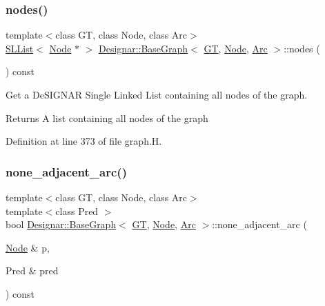 \subsubsection{\texorpdfstring{nodes()}{nodes()}}
{\footnotesize\ttfamily template$<$class GT, class Node, class Arc$>$ \\
\hyperlink{class_designar_1_1_s_l_list}{S\+L\+List}$<$ \hyperlink{namespace_designar_a5af326c65aa2bd26b26c410f2030d09e}{Node} $\ast$ $>$ \hyperlink{class_designar_1_1_base_graph}{Designar\+::\+Base\+Graph}$<$ \hyperlink{demo-buildgraph_8_c_a3001c40d2c31ca87ed96cd7d1334a55e}{GT}, \hyperlink{namespace_designar_a5af326c65aa2bd26b26c410f2030d09e}{Node}, \hyperlink{namespace_designar_a3f55fb5513d62ff47cbc8f72b8e95d6f}{Arc} $>$\+::nodes (\begin{DoxyParamCaption}{ }\end{DoxyParamCaption}) const\hspace{0.3cm}{\ttfamily [inline]}}



Get a De\+S\+I\+G\+N\+AR Single Linked List containing all nodes of the graph. 

\begin{DoxyReturn}{Returns}
A list containing all nodes of the graph 
\end{DoxyReturn}


Definition at line 373 of file graph.\+H.

\mbox{\label{class_designar_1_1_base_graph_acf4b230e0d981f36770722011c96206f}} 
\subsubsection{\texorpdfstring{none\+\_\+adjacent\+\_\+arc()}{none\_adjacent\_arc()}\hspace{0.1cm}{\footnotesize\ttfamily [1/2]}}
{\footnotesize\ttfamily template$<$class GT, class Node, class Arc$>$ \\
template$<$class Pred $>$ \\
bool \hyperlink{class_designar_1_1_base_graph}{Designar\+::\+Base\+Graph}$<$ \hyperlink{demo-buildgraph_8_c_a3001c40d2c31ca87ed96cd7d1334a55e}{GT}, \hyperlink{namespace_designar_a5af326c65aa2bd26b26c410f2030d09e}{Node}, \hyperlink{namespace_designar_a3f55fb5513d62ff47cbc8f72b8e95d6f}{Arc} $>$\+::none\+\_\+adjacent\+\_\+arc (\begin{DoxyParamCaption}\item[{\hyperlink{namespace_designar_a5af326c65aa2bd26b26c410f2030d09e}{Node} \&}]{p,  }\item[{Pred \&}]{pred }\end{DoxyParamCaption}) const\hspace{0.3cm}{\ttfamily [inline]}}



